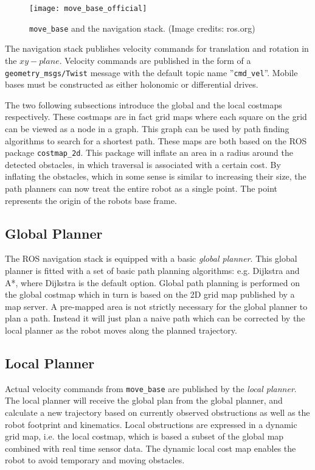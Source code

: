 \begin{figure}[h]
    \centering
    \texttt{[image: move\_base\_official]}
    \caption{\texttt{move\_base} and the navigation stack. (Image credits:  ros.org)}
    \label{fig:move_base_official}
\end{figure}

The navigation stack publishes velocity commands for translation and rotation in the $xy-plane$. Velocity commands are published in the form of a \texttt{geometry\_msgs/Twist} message with the default topic name ''\texttt{cmd\_vel}''. Mobile bases must be constructed as either holonomic or differential drives.

The two following subsections introduce the global and the local costmaps respectively. These costmaps are in fact grid maps where each square on the grid can be viewed as a node in a graph. This graph can be used by path finding algorithms to search for a shortest path. These maps are both based on the \ac{ROS} package \texttt{costmap\_2d}. This package will inflate an area in a radius around the detected obstacles, in which traversal is associated with a certain cost. By inflating the obstacles, which in some sense is similar to increasing their size, the path planners can now treat the entire robot as a single point. The point represents the origin of the robots base frame.

\subsection{Global Planner}

The \ac{ROS} navigation stack is equipped with a basic \textit{global planner}. This global planner is fitted with a set of basic path planning algorithms: e.g. Dijkstra and A*, where Dijkstra is the default option. Global path planning is performed on the global costmap which in turn is based on the 2D grid map published by a map server. A pre-mapped area is not strictly necessary for the global planner to plan a path. Instead it will just plan a naive path which can be corrected by the local planner as the robot moves along the planned trajectory.

\subsection{Local Planner}

Actual velocity commands from \texttt{move\_base} are published by the \textit{local planner}. The local planner will receive the global plan from the global planner, and calculate a new trajectory based on currently observed obstructions as well as the robot footprint and kinematics. Local obstructions are expressed in a dynamic grid map, i.e. the local costmap, which is based a subset of the global map combined with real time sensor data. The dynamic local cost map enables the robot to avoid temporary and moving obstacles.

